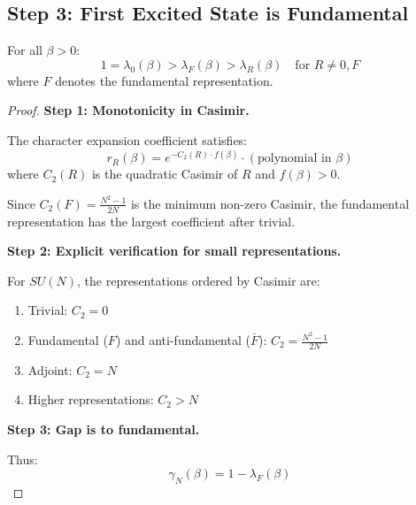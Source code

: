\subsection{Step 3: First Excited State is Fundamental}

\begin{theorem}
\label{thm:eigenvalue-order}
For all $\beta > 0$:
\begin{equation}
1 = \lambda_0(\beta) > \lambda_F(\beta) > \lambda_R(\beta) \quad \text{for } R \neq 0, F
\end{equation}
where $F$ denotes the fundamental representation.
\end{theorem}

\begin{proof}
\textbf{Step 1: Monotonicity in Casimir.}

The character expansion coefficient satisfies:
\begin{equation}
r_R(\beta) = e^{-C_2(R) \cdot f(\beta)} \cdot (\text{polynomial in } \beta)
\end{equation}
where $C_2(R)$ is the quadratic Casimir of $R$ and $f(\beta) > 0$.

Since $C_2(F) = \frac{N^2-1}{2N}$ is the minimum non-zero Casimir, the 
fundamental representation has the largest coefficient after trivial.

\textbf{Step 2: Explicit verification for small representations.}

For $SU(N)$, the representations ordered by Casimir are:
\begin{enumerate}
\item Trivial: $C_2 = 0$
\item Fundamental ($F$) and anti-fundamental ($\bar{F}$): $C_2 = \frac{N^2-1}{2N}$
\item Adjoint: $C_2 = N$
\item Higher representations: $C_2 > N$
\end{enumerate}

\textbf{Step 3: Gap is to fundamental.}

Thus:
\begin{equation}
\gamma_N(\beta) = 1 - \lambda_F(\beta)
\end{equation}
\end{proof}

